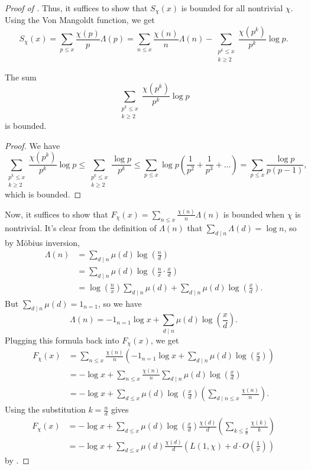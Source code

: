 \documentclass{scrartcl}
\begin{document}
\begin{proof}[Proof of ]
	Thus, it suffices to show that $S_\chi(x)$ is bounded for all nontrivial $\chi$. 
	Using the Von Mangoldt function, we get 
	$$S_\chi(x) = \sum_{p\le x}\frac{\chi(p)}{p} \Lambda(p) = \sum_{n\le x} \frac{\chi(n)}{n}\Lambda(n)
	-\sum_{\substack{p^k\le x \\ k\ge 2}} \frac{\chi(p^k)}{p^k}\log p.$$ 
	
	\begin{claim}
		The sum 
		$$\sum_{\substack{p^k\le x \\ k\ge 2}}\frac{\chi(p^k)}{p^k}\log p$$ 
		is bounded. 
	\end{claim}
	
	\begin{proof}
		We have 
		$$\sum_{\substack{p^k\le x \\ k\ge 2}}\frac{\chi(p^k)}{p^k}\log p\le 
		\sum_{\substack{p^k\le x \\ k\ge 2}}\frac{\log p}{p^k} \le 
		\sum_{p\le x} \log p\left(\frac{1}{p^2}+\frac{1}{p^3}+\dots\right)
		= \sum_{p\le x} \frac{\log p}{p(p-1)},$$
		which is bounded. 
	\end{proof}
	
	Now, it suffices to show that $F_\chi(x) = \sum_{n\le x}\frac{\chi(n)}{n} \Lambda(n)$ is bounded 
	when $\chi$ is nontrivial. 
	It's clear from the definition of $\Lambda(n)$ that $\sum_{d\mid n}\Lambda(d) = \log n$, so by M\"obius 
	inversion, 
	\begin{align*}
		\Lambda(n) &= \sum_{d\mid n}\mu(d)\log \left(\frac{n}{d}\right) \\
		&= \sum_{d\mid n} \mu(d) \log\left(\frac{n}{x}\cdot \frac{x}{d}\right) \\
		&= \log\left(\frac{n}{x}\right) \sum_{d\mid n} \mu(d)+\sum_{d\mid n}\mu(d)\log \left(\frac{x}{d}\right).
	\end{align*}
	But $\sum_{d\mid n}\mu(d) = 1_{n=1}$, so we have 
	$$\Lambda(n) = -1_{n=1}\log x+\sum_{d\mid n}\mu(d)\log\left(\frac{x}{d}\right).$$
	Plugging this formula back into $F_\chi(x)$, we get 
	\begin{align*}
		F_\chi(x) &= \sum_{n\le x} \frac{\chi(n)}{n}\left(-1_{n=1}\log x+
		\sum_{d\mid n}\mu(d)\log \left(\frac{x}{d}\right)\right) \\
		&= -\log x +\sum_{n\le x}\frac{\chi(n)}{n} \sum_{d\mid n}\mu(d)\log \left(\frac{x}{d}\right) \\
		&= -\log x +\sum_{d\le x}\mu(d)\log \left(\frac{x}{d}\right)\left(\sum_{d\mid n\le x}\frac{\chi(n)}{n}\right).
	\end{align*}
	Using the substitution $k=\frac{n}{d}$ gives 
	\begin{align*}
	F_\chi(x) &= -\log x + \sum_{d\le x}\mu(d)\log\left(\frac{x}{d}\right)\frac{\chi(d)}{d} 
	\left(\sum_{k\le \frac{x}{d}}\frac{\chi(k)}{k}\right)\\
	&= -\log x+\sum_{d\le x}\mu(d)\frac{\chi(d)}{d}\left(L(1, \chi)+d\cdot O\left(\frac{1}{x}\right)\right)
	\end{align*}
	by .
	

\end{proof}
\end{document}
